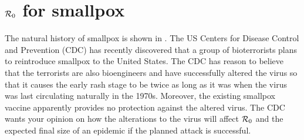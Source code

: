 \documentclass[12pt]{article}\usepackage[]{graphicx}\usepackage[]{color}
\makeatletter
\newcommand{\hlnum}[1]{\textcolor[rgb]{0.686,0.059,0.569}{#1}}%
\newcommand{\hlstr}[1]{\textcolor[rgb]{0.192,0.494,0.8}{#1}}%
\newcommand{\hlcom}[1]{\textcolor[rgb]{0.678,0.584,0.686}{\textit{#1}}}%
\newcommand{\hlopt}[1]{\textcolor[rgb]{0,0,0}{#1}}%
\newcommand{\hlstd}[1]{\textcolor[rgb]{0.345,0.345,0.345}{#1}}%
\newcommand{\hlkwa}[1]{\textcolor[rgb]{0.161,0.373,0.58}{\textbf{#1}}}%
\newcommand{\hlkwb}[1]{\textcolor[rgb]{0.69,0.353,0.396}{#1}}%
\newcommand{\hlkwc}[1]{\textcolor[rgb]{0.333,0.667,0.333}{#1}}%
\newcommand{\hlkwd}[1]{\textcolor[rgb]{0.737,0.353,0.396}{\textbf{#1}}}%
\newenvironment{kframe}{%
 \def\at@end@of@kframe{}%
 \ifinner\ifhmode%
  \def\at@end@of@kframe{\end{minipage}}%
  \begin{minipage}{\columnwidth}%
 \fi\fi%
 \def\FrameCommand##1{\hskip\@totalleftmargin \hskip-\fboxsep
 \colorbox{shadecolor}{##1}\hskip-\fboxsep
     \hskip-\linewidth \hskip-\@totalleftmargin \hskip\columnwidth}%
 \MakeFramed {\advance\hsize-\width
   \@totalleftmargin\z@ \linewidth\hsize
   \@setminipage}}%
 {\par\unskip\endMakeFramed%
 \at@end@of@kframe}
\newenvironment{knitrout}{}{} %
\makeatother
\begin{document}

\section{${\cal R}_0$ for smallpox}

The natural history of smallpox is shown in .  The US Centers for Disease Control and Prevention (CDC) has recently discovered that a group of bioterrorists plans to reintroduce smallpox to the United States.  The CDC has reason to believe that the terrorists are also bioengineers and have successfully altered the virus so that it causes the early rash stage to be twice as long as it was when the virus was last circulating naturally in the 1970s.  Moreover, the existing smallpox vaccine apparently provides no protection against the altered virus.  The CDC wants your opinion on how the alterations to the virus will affect ${\cal R}_0$ and the expected final size of an epidemic if the planned attack is successful.
\end{document}
